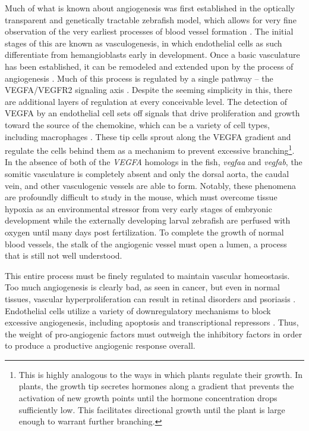 Much of what is known about angiogenesis was first established in the optically transparent and genetically tractable zebrafish model, which allows for very fine observation of the very earliest processes of blood vessel formation \citep{Chan2002, Chavez2016}. The initial stages of this are known as vasculogenesis, in which endothelial cells as such differentiate from hemangioblasts early in development. Once a basic vasculature has been established, it can be remodeled and extended upon by the process of angiogenesis \citep{Koch2012}. Much of this process is regulated by a single pathway -- the VEGFA/VEGFR2 signaling axis \citep{Olsson2006, Chung2011, Villanueva2016}. Despite the seeming simplicity in this, there are additional layers of regulation at every conceivable level. The detection of VEGFA by an endothelial cell sets off signals that drive proliferation and growth toward the source of the chemokine, which can be a variety of cell types, including macrophages \citep{Olsson2006}. These tip cells sprout along the VEGFA gradient and regulate the cells behind them as a mechanism to prevent excessive branching\footnote{This is highly analogous to the ways in which plants regulate their growth. In plants, the growth tip secretes hormones along a gradient that prevents the activation of new growth points until the hormone concentration drops sufficiently low. This facilitates directional growth until the plant is large enough to warrant further branching.}. In the absence of both of the \textit{VEGFA} homologs in the fish, \textit{vegfaa} and \textit{vegfab}, the somitic vasculature is completely absent and only the dorsal aorta, the caudal vein, and other vasculogenic vessels are able to form. Notably, these phenomena are profoundly difficult to study in the mouse, which must overcome tissue hypoxia as an environmental stressor from very early stages of embryonic development while the externally developing larval zebrafish are perfused with oxygen until many days post fertilization. To complete the growth of normal blood vessels, the stalk of the angiogenic vessel must open a lumen, a process that is still not well understood. 

This entire process must be finely regulated to maintain vascular homeostasis. Too much angiogenesis is clearly bad, as seen in cancer, but even in normal tissues, vascular hyperproliferation can result in retinal disorders and psoriasis \citep{Bisht2010, Malecic2017, Gupta2005}. Endothelial cells utilize a variety of downregulatory mechanisms to block excessive angiogenesis, including apoptosis and transcriptional repressors \citep{BenShoham2012, Chavakis2002, GarciaBarros2003, Duval2003, Dimmeler2002, Stefanec2000}. Thus, the weight of pro\hyp{}angiogenic factors must outweigh the inhibitory factors in order to produce a productive angiogenic response overall. 

